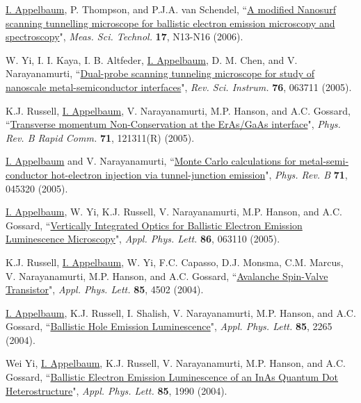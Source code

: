 \documentclass[paper=letter,fontsize=11pt]{scrartcl} %
\newcommand{\PaperEntry}[7]{
		\noindent #1, ``\href{#7}{#2}", \textit{#3} \textbf{#4}, #5 (#6).}
\begin{document}
\begin{etaremune}
\item\PaperEntry{\underline{I. Appelbaum}, P. Thompson, and P.J.A. van Schendel}{A modified Nanosurf scanning tunnelling microscope for ballistic electron emission microscopy and spectroscopy}{Meas. Sci. Technol.}{17}{N13-N16}{2006}{http://dx.doi.org/10.1088/0957-0233/17/4/N02}

\item\PaperEntry{W. Yi, I. I. Kaya, I. B. Altfeder, \underline{I. Appelbaum}, D. M. Chen, and V. Narayanamurti}{Dual-probe scanning tunneling microscope for study of nanoscale metal-semiconductor interfaces}{Rev. Sci. Instrum.}{76}{063711}{2005}{http://dx.doi.org/10.1063/1.1938969}

\item\PaperEntry{K.J. Russell, \underline{I. Appelbaum}, V. Narayanamurti, M.P. Hanson, and A.C. Gossard}{Transverse momentum Non-Conservation at the ErAs/GaAs interface}{Phys. Rev. B Rapid Comm.}{71}{121311(R)}{2005}{http://dx.doi.org/10.1103/PhysRevB.71.121311} 

\item\PaperEntry{\underline{I. Appelbaum} and V. Narayanamurti}{Monte Carlo calculations for metal-semi-conductor hot-electron injection via tunnel-junction emission}{Phys. Rev. B}{71}{045320}{2005}{http://dx.doi.org/10.1103/PhysRevB.71.045320}

\item\PaperEntry{\underline{I. Appelbaum}, W. Yi, K.J. Russell, V. Narayanamurti, M.P. Hanson, and A.C. Gossard}{Vertically Integrated Optics for Ballistic Electron Emission Luminescence Microscopy}{Appl. Phys. Lett.}{86}{063110}{2005}{http://dx.doi.org/10.1063/1.1861961}

\item\PaperEntry{K.J. Russell, \underline{I. Appelbaum}, W. Yi, F.C. Capasso, D.J. Monsma, C.M. Marcus, V. Narayanamurti, M.P. Hanson, and A.C. Gossard}{Avalanche Spin-Valve Transistor}{Appl. Phys. Lett.}{85}{4502}{2004}{http://dx.doi.org/10.1063/1.1818339}

\item\PaperEntry{\underline{I. Appelbaum}, K.J. Russell, I. Shalish, V. Narayanamurti, M.P. Hanson, and A.C. Gossard}{Ballistic Hole Emission Luminescence}{Appl. Phys. Lett.}{85}{2265}{2004}{http://dx.doi.org/10.1063/1.1793347}

\item\PaperEntry{Wei Yi, \underline{I. Appelbaum}, K.J. Russell, V. Narayanamurti, M.P. Hanson, and A.C. Gossard}{Ballistic Electron Emission Luminescence of an InAs Quantum Dot Heterostructure}{Appl. Phys. Lett.}{85}{1990}{2004}{http://dx.doi.org/10.1063/1.1790595}


\end{etaremune}
\end{document}
